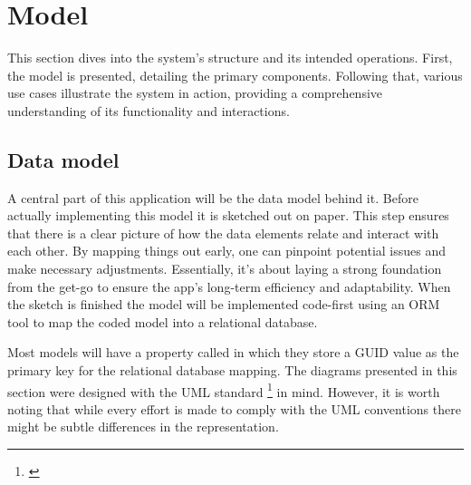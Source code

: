 \newpage

\section{Model}

This section dives into the system's structure and its intended operations. 
First, the model is presented, detailing the primary components. 
Following that, various use cases illustrate the system in action, providing a comprehensive understanding of its functionality and interactions.

\subsection{Data model}

A central part of this application will be the data model behind it. 
Before actually implementing this model it is sketched out on paper. 
This step ensures that there is a clear picture of how the data elements relate and interact with each other. 
By mapping things out early, one can pinpoint potential issues and make necessary adjustments. 
Essentially, it's about laying a strong foundation from the get-go to ensure the app's long-term efficiency and adaptability. 
When the sketch is finished the model will be implemented code-first using an ORM tool to map the coded model into a relational database. 

Most models will have a property called  in which they store a GUID value as the primary key for the relational database mapping. 
The diagrams presented in this section were designed with the UML standard \footnote{\cite{uml_standard}} in mind. 
However, it is worth noting that while every effort is made to comply with the UML conventions there might be subtle differences in the representation. 

